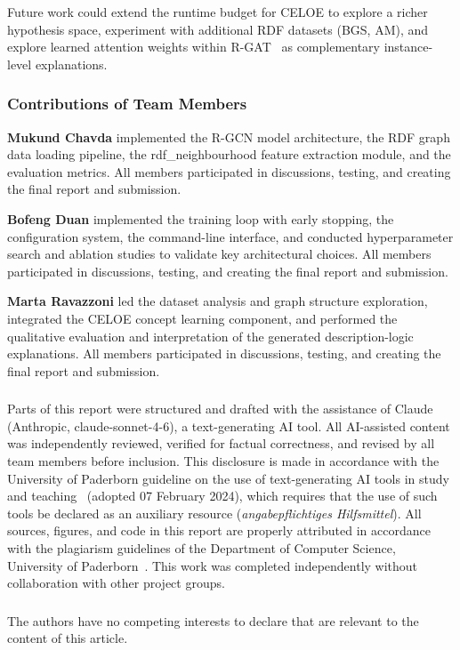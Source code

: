 \documentclass[runningheads]{llncs}
\begin{document}
Future work could extend the runtime budget for CELOE to explore a richer hypothesis space,
experiment with additional RDF datasets (BGS, AM), and explore learned attention weights
within R-GAT~\cite{busbridge2019} as complementary instance-level explanations.

\begin{credits}
\subsubsection{Contributions of Team Members}
\textbf{Mukund Chavda} implemented the R-GCN model architecture, the RDF graph data loading
pipeline, the rdf\_neighbourhood feature extraction module, and the evaluation metrics.
All members participated in discussions, testing, and creating the final report and submission.

\textbf{Bofeng Duan} implemented the training loop with early stopping, the configuration
system, the command-line interface, and conducted hyperparameter search and ablation studies
to validate key architectural choices.
All members participated in discussions, testing, and creating the final report and submission.

\textbf{Marta Ravazzoni} led the dataset analysis and graph structure exploration, integrated
the CELOE concept learning component, and performed the qualitative evaluation and
interpretation of the generated description-logic explanations.
All members participated in discussions, testing, and creating the final report and submission.

\subsubsection{\ackname}
Parts of this report were structured and drafted with the assistance of Claude
(Anthropic, claude-sonnet-4-6), a text-generating AI tool.
All AI-assisted content was independently reviewed, verified for factual correctness, and
revised by all team members before inclusion.
This disclosure is made in accordance with the University of Paderborn guideline on the use
of text-generating AI tools in study and teaching~\cite{upb_ai_guideline} (adopted
07 February 2024), which requires that the use of such tools be declared as an auxiliary
resource (\emph{angabepflichtiges Hilfsmittel}).
All sources, figures, and code in this report are properly attributed in accordance with the
plagiarism guidelines of the Department of Computer Science, University of
Paderborn~\cite{plagiarism_leaflet}.
This work was completed independently without collaboration with other project groups.

\subsubsection{\discintname}
The authors have no competing interests to declare that are relevant to the content of this
article.
\end{credits}
\end{document}
